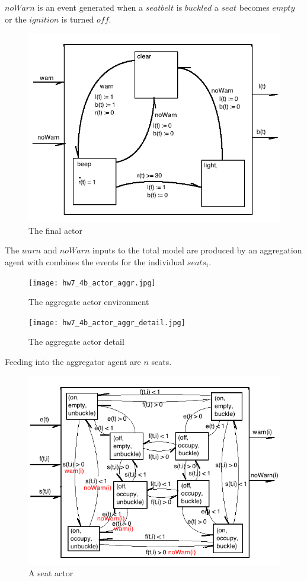 \documentclass{article}
\begin{document}
$noWarn$ is an event generated when a $seatbelt$ is $buckled$
a $seat$ becomes $empty$ or the $ignition$ is turned $off$.

\begin{figure}[h!]
\centering
\includegraphics[scale=0.7]{hw7_4b_actor_total.png}
\caption{The final actor}
\label{fig:4b_actor_total}
\end{figure}

The $warn$ and $noWarn$ inputs to the total model are
produced by an aggregation agent with combines the
events for the individual $seats_i$.

\begin{figure}[h!]
\centering
\texttt{[image: hw7\_4b\_actor\_aggr.jpg]}
\caption{The aggregate actor environment}
\label{fig:4b_actor_aggr_env}
\end{figure}

\begin{figure}[h!]
\centering
\texttt{[image: hw7\_4b\_actor\_aggr\_detail.jpg]}
\caption{The aggregate actor detail}
\label{fig:4b_actor_aggr_detail}
\end{figure}

Feeding into the aggregator agent are $n$ seats.


\begin{figure}[h!]
\centering
\includegraphics[scale=0.7]{hw7_4b_actor_seat.png}
\caption{A seat actor}
\label{fig:4b_actor_seat}
\end{figure}
\end{document}
